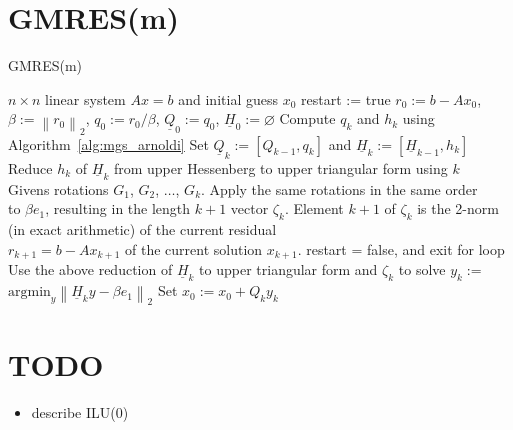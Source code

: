 \documentclass{scrartcl}
\numberwithin{equation}{section}
\newcommand{\norm}[1]{\left\lVert#1\right\rVert}
\begin{document}
\begin{appendices}
\section{GMRES(m)}\label{app:gmres(m)}
\begin{algorithm}
\caption{GMRES(m)}
\label{alg:gmres(m)}
\begin{algorithmic}[1]
    \REQUIRE $n \times n$ linear system $Ax = b$ and initial guess $x_0$
    \STATE restart := true
    	\STATE $r_0:=b - Ax_0$, $\beta := \norm{r_0}_2$, $q_0 := r_0/\beta$, $\underline{Q}_0 := q_0$, $\underline{H}_0 := \varnothing$
			\STATE Compute $q_k$ and $h_k$ using Algorithm~\ref{alg:mgs_arnoldi}
			\STATE Set $\underline{Q}_k := [Q_{k-1},q_k]$ and $\underline{H}_k := [\underline{H}_{k -1}, h_k]$
			\STATE Reduce ${h_k}$ of $\underline{H}_k$ from upper Hessenberg to upper triangular form using $k$ \\
		\hspace{\algorithmicindent} Givens rotations $G_1$, $G_2$, $ \ldots$, $G_{k}$. Apply the same rotations in the same order \\ 
		\hspace{\algorithmicindent} to $\beta e_1$,  resulting in the length $k + 1$ vector $\zeta_{k}$.
			\STATE Element $k + 1$ of $\zeta_k$ is the 2-norm (in exact arithmetic) of the current residual \\
\hspace{\algorithmicindent} $r_{k + 1} = b - Ax_{k + 1}$ of the current solution $x_{k + 1}$.
			\STATE restart = false, and exit for loop		
		\ENDIF
		\ENDFOR
		\STATE Use the above reduction of $\underline{H}_k$ to upper triangular form and $\zeta_k$ to solve $y_k :=$ \\ \hspace{\algorithmicindent} $\text{argmin}_{y} \norm{\underline{H}_k y - \beta e_1}_2$
		\STATE Set $x_0 := x_0 + Q_k y_k$
	\ENDWHILE 
\end{algorithmic}
\end{algorithm}



\section{TODO}
\begin{itemize}
\item describe ILU(0)


\end{itemize}
\end{appendices}
\end{document}
